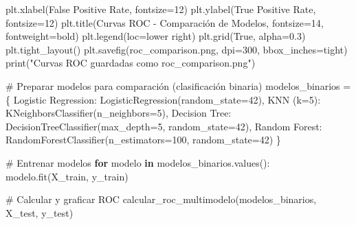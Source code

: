 \documentclass[
  doc,
  floatsintext,
  longtable,
  a4paper,
  nolmodern,
  notxfonts,
  notimes,
  12pt,
  colorlinks=true,linkcolor=blue,citecolor=blue,urlcolor=blue]{apa7}
\newenvironment{Shaded}{\begin{snugshade}}{\end{snugshade}}
\newcommand{\BuiltInTok}[1]{\textcolor[rgb]{0.00,0.23,0.31}{#1}}
\newcommand{\CommentTok}[1]{\textcolor[rgb]{0.37,0.37,0.37}{#1}}
\newcommand{\ControlFlowTok}[1]{\textcolor[rgb]{0.00,0.23,0.31}{\textbf{#1}}}
\newcommand{\DecValTok}[1]{\textcolor[rgb]{0.68,0.00,0.00}{#1}}
\newcommand{\FloatTok}[1]{\textcolor[rgb]{0.68,0.00,0.00}{#1}}
\newcommand{\KeywordTok}[1]{\textcolor[rgb]{0.00,0.23,0.31}{\textbf{#1}}}
\newcommand{\NormalTok}[1]{\textcolor[rgb]{0.00,0.23,0.31}{#1}}
\newcommand{\OperatorTok}[1]{\textcolor[rgb]{0.37,0.37,0.37}{#1}}
\newcommand{\StringTok}[1]{\textcolor[rgb]{0.13,0.47,0.30}{#1}}
\newcommand{\VariableTok}[1]{\textcolor[rgb]{0.07,0.07,0.07}{#1}}
\begin{document}
\begin{Shaded}
\begin{Highlighting}[]
\NormalTok{    plt.xlabel(}\StringTok{\textquotesingle{}False Positive Rate\textquotesingle{}}\NormalTok{, fontsize}\OperatorTok{=}\DecValTok{12}\NormalTok{)}
\NormalTok{    plt.ylabel(}\StringTok{\textquotesingle{}True Positive Rate\textquotesingle{}}\NormalTok{, fontsize}\OperatorTok{=}\DecValTok{12}\NormalTok{)}
\NormalTok{    plt.title(}\StringTok{\textquotesingle{}Curvas ROC {-} Comparación de Modelos\textquotesingle{}}\NormalTok{, }
\NormalTok{              fontsize}\OperatorTok{=}\DecValTok{14}\NormalTok{, fontweight}\OperatorTok{=}\StringTok{\textquotesingle{}bold\textquotesingle{}}\NormalTok{)}
\NormalTok{    plt.legend(loc}\OperatorTok{=}\StringTok{\textquotesingle{}lower right\textquotesingle{}}\NormalTok{)}
\NormalTok{    plt.grid(}\VariableTok{True}\NormalTok{, alpha}\OperatorTok{=}\FloatTok{0.3}\NormalTok{)}
\NormalTok{    plt.tight\_layout()}
\NormalTok{    plt.savefig(}\StringTok{\textquotesingle{}roc\_comparison.png\textquotesingle{}}\NormalTok{, dpi}\OperatorTok{=}\DecValTok{300}\NormalTok{, bbox\_inches}\OperatorTok{=}\StringTok{\textquotesingle{}tight\textquotesingle{}}\NormalTok{)}
    \BuiltInTok{print}\NormalTok{(}\StringTok{"Curvas ROC guardadas como \textquotesingle{}roc\_comparison.png\textquotesingle{}"}\NormalTok{)}

\CommentTok{\# Preparar modelos para comparación (clasificación binaria)}
\NormalTok{modelos\_binarios }\OperatorTok{=}\NormalTok{ \{}
    \StringTok{\textquotesingle{}Logistic Regression\textquotesingle{}}\NormalTok{: LogisticRegression(random\_state}\OperatorTok{=}\DecValTok{42}\NormalTok{),}
    \StringTok{\textquotesingle{}KNN (k=5)\textquotesingle{}}\NormalTok{: KNeighborsClassifier(n\_neighbors}\OperatorTok{=}\DecValTok{5}\NormalTok{),}
    \StringTok{\textquotesingle{}Decision Tree\textquotesingle{}}\NormalTok{: DecisionTreeClassifier(max\_depth}\OperatorTok{=}\DecValTok{5}\NormalTok{, random\_state}\OperatorTok{=}\DecValTok{42}\NormalTok{),}
    \StringTok{\textquotesingle{}Random Forest\textquotesingle{}}\NormalTok{: RandomForestClassifier(n\_estimators}\OperatorTok{=}\DecValTok{100}\NormalTok{, random\_state}\OperatorTok{=}\DecValTok{42}\NormalTok{)}
\NormalTok{\}}

\CommentTok{\# Entrenar modelos}
\ControlFlowTok{for}\NormalTok{ modelo }\KeywordTok{in}\NormalTok{ modelos\_binarios.values():}
\NormalTok{    modelo.fit(X\_train, y\_train)}

\CommentTok{\# Calcular y graficar ROC}
\NormalTok{calcular\_roc\_multimodelo(modelos\_binarios, X\_test, y\_test)}
\end{Highlighting}
\end{Shaded}
\end{document}
